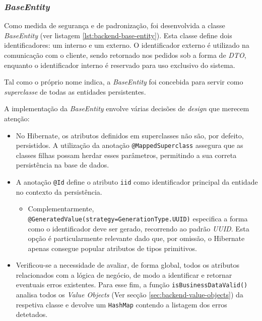 \subsubsection{\textit{BaseEntity}}
\label{sec:backend-base-entity}

Como medida de segurança e de padronização, foi desenvolvida a classe \textit{BaseEntity} (ver listagem \ref{lst:backend-base-entity}). Esta classe define dois identificadores: um interno e um externo. O identificador externo é utilizado na comunicação com o cliente, sendo retornado nos pedidos sob a forma de \textit{DTO}, enquanto o identificador interno é reservado para uso exclusivo do sistema.

Tal como o próprio nome indica, a \textit{BaseEntity} foi concebida para servir como \textit{superclasse} de todas as entidades persistentes.

A implementação da \textit{BaseEntity} envolve várias decisões de \textit{design} que merecem atenção:

\begin{itemize}
    \item No \gls{Hibernate}, os atributos definidos em superclasses não são, por defeito, persistidos. A utilização da anotação \lstinline|@MappedSuperclass| assegura que as classes filhas possam herdar esses parâmetros, permitindo a sua correta persistência na base de dados.

    \item A anotação \lstinline|@Id| define o atributo \lstinline|iid| como identificador principal da entidade no contexto da persistência. 
    
    \begin{itemize}
        \item Complementarmente, \lstinline|@GeneratedValue(strategy=GenerationType.UUID)| especifica a forma como o identificador deve ser gerado, recorrendo ao padrão \textit{UUID}. Esta opção é particularmente relevante dado que, por omissão, o \gls{Hibernate} apenas consegue popular atributos de tipos primitivos.
    \end{itemize}
    
    \item Verificou-se a necessidade de avaliar, de forma global, todos os atributos relacionados com a lógica de negócio, de modo a identificar e retornar eventuais erros existentes. Para esse fim, a função \lstinline|isBusinessDataValid()| analisa todos os \textit{Value Objects} (Ver secção \ref{sec:backend-value-objects}) da respetiva classe e devolve um \lstinline|HashMap| contendo a listagem dos erros detetados.
\end{itemize}

